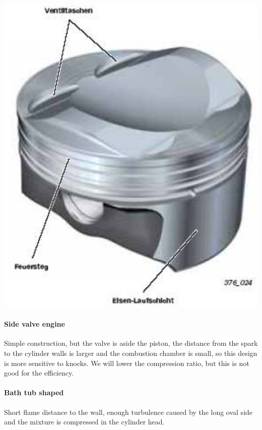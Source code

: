 \begin{center}
\begin{minipage}{0.18\textwidth}
	\end{minipage}
	\begin{minipage}{0.18 \textwidth}
	\includegraphics[scale=0.25]{ch4/24}
	\end{minipage}
	\end{center}
	
	\paragraph{Side valve engine}
	Simple construction, but the valve is aside the piston, the distance from the spark to the cylinder walls is larger and the combustion chamber is small, so this design is more sensitive to knocks. We will lower the compression ratio, but this is not good for the efficiency. 
	
	\paragraph{Bath tub shaped}
	Short flame distance to the wall, enough turbulence caused by the long oval side and the mixture is compressed in the cylinder head. 
	
